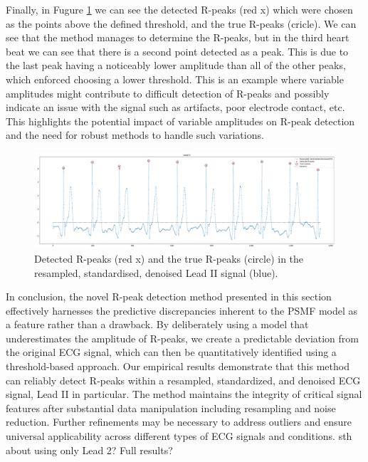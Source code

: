 \documentclass{mldsmsc}
\begin{document}
\noindent Finally, in Fugure \ref{fig:rpeaks-ecg} we can see the detected R-peaks (red x) which were chosen as the points above the defined threshold, and the true R-peaks (cricle). We can see that the method manages to determine the R-peaks, but in the third heart beat we can see that there is a second point detected as a peak. This is due to the last peak having a noticeably lower amplitude than all of the other peaks, which enforced choosing a lower threshold. This is an example where variable amplitudes might contribute to difficult detection of R-peaks and possibly indicate an issue with the signal such as artifacts, poor electrode contact, etc. This highlights the potential impact of variable amplitudes on R-peak detection and the need for robust methods to handle such variations.

\begin{figure}[H]
\centering
\includegraphics[width=1\linewidth]{images/r_peaks/resampled_standardised_denoised_ecg_rpeaks_m.pdf}
\caption{Detected R-peaks (red x) and the true R-peaks (circle) in the resampled, standardised, denoised Lead II signal (blue).}
\label{fig:rpeaks-ecg}
\end{figure}

\noindent In conclusion, the novel R-peak detection method presented in this section effectively harnesses the predictive discrepancies inherent to the PSMF model as a feature rather than a drawback. By deliberately using a model that underestimates the amplitude of R-peaks, we create a predictable deviation from the original ECG signal, which can then be quantitatively identified using a threshold-based approach. Our empirical results demonstrate that this method can reliably detect R-peaks within a resampled, standardized, and denoised ECG signal, Lead II in particular. The method maintains the integrity of critical signal features after substantial data manipulation including resampling and noise reduction. Further refinements may be necessary to address outliers and ensure universal applicability across different types of ECG signals and conditions.
\newline
sth about using only Lead 2?
Full results?
\end{document}
